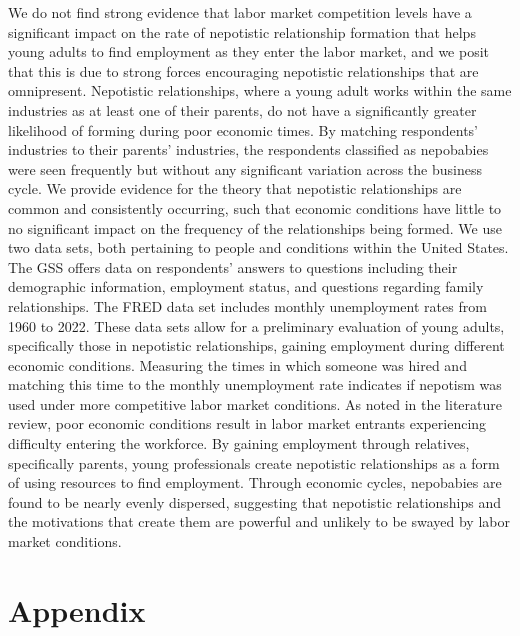 \documentclass[12pt]{article}
\begin{document}
We do not find strong evidence that labor market competition levels have a significant impact on the rate of nepotistic relationship formation that helps young adults to find employment as they enter the labor market, and we posit that this is due to strong forces encouraging nepotistic relationships that are omnipresent. Nepotistic relationships, where a young adult works within the same industries as at least one of their parents, do not have a significantly greater likelihood of forming during poor economic times. By matching respondents’ industries to their parents’ industries, the respondents classified as nepobabies were seen frequently but without any significant variation across the business cycle. We provide evidence for the theory that nepotistic relationships are common and consistently occurring, such that economic conditions have little to no significant impact on the frequency of the relationships being formed. 
We use two data sets, both pertaining to people and conditions within the United States. The GSS offers data on respondents' answers to questions including their demographic information, employment status, and questions regarding family relationships. The FRED data set includes monthly unemployment rates from 1960 to 2022. These data sets allow for a preliminary evaluation of young adults, specifically those in nepotistic relationships, gaining employment during different economic conditions.
Measuring the times in which someone was hired and matching this time to the monthly unemployment rate indicates if nepotism was used under more competitive labor market conditions. As noted in the literature review, poor economic conditions result in labor market entrants experiencing difficulty entering the workforce. By gaining employment through relatives, specifically parents, young professionals create nepotistic relationships as a form of using resources to find employment. Through economic cycles, nepobabies are found to be nearly evenly dispersed, suggesting that nepotistic relationships and the motivations that create them are powerful and unlikely to be swayed by labor market conditions. 



\newpage
\singlespacing
\setlength\bibsep{1pt}




\newpage
\appendix
\section{Appendix}
\label{sec:appendix}
\end{document}
